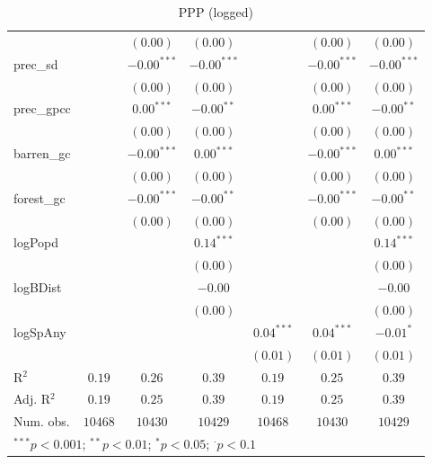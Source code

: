 \begin{sidewaystable}
\begin{center}
{\begin{tabular}{l c c c c c c}
                &               & $(0.00)$      & $(0.00)$      &               & $(0.00)$      & $(0.00)$      \\
prec\_sd        &               & $-0.00^{***}$ & $-0.00^{***}$ &               & $-0.00^{***}$ & $-0.00^{***}$ \\
                &               & $(0.00)$      & $(0.00)$      &               & $(0.00)$      & $(0.00)$      \\
prec\_gpcc      &               & $0.00^{***}$  & $-0.00^{**}$  &               & $0.00^{***}$  & $-0.00^{**}$  \\
                &               & $(0.00)$      & $(0.00)$      &               & $(0.00)$      & $(0.00)$      \\
barren\_gc      &               & $-0.00^{***}$ & $0.00^{***}$  &               & $-0.00^{***}$ & $0.00^{***}$  \\
                &               & $(0.00)$      & $(0.00)$      &               & $(0.00)$      & $(0.00)$      \\
forest\_gc      &               & $-0.00^{***}$ & $-0.00^{**}$  &               & $-0.00^{***}$ & $-0.00^{**}$  \\
                &               & $(0.00)$      & $(0.00)$      &               & $(0.00)$      & $(0.00)$      \\
logPopd         &               &               & $0.14^{***}$  &               &               & $0.14^{***}$  \\
                &               &               & $(0.00)$      &               &               & $(0.00)$      \\
logBDist        &               &               & $-0.00$       &               &               & $-0.00$       \\
                &               &               & $(0.00)$      &               &               & $(0.00)$      \\
logSpAny        &               &               &               & $0.04^{***}$  & $0.04^{***}$  & $-0.01^{*}$   \\
                &               &               &               & $(0.01)$      & $(0.01)$      & $(0.01)$      \\
\hline
R$^2$           & $0.19$        & $0.26$        & $0.39$        & $0.19$        & $0.25$        & $0.39$        \\
Adj. R$^2$      & $0.19$        & $0.25$        & $0.39$        & $0.19$        & $0.25$        & $0.39$        \\
Num. obs.       & $10468$       & $10430$       & $10429$       & $10468$       & $10430$       & $10429$       \\
\hline
\multicolumn{7}{l}{\scriptsize{$^{***}p<0.001$; $^{**}p<0.01$; $^{*}p<0.05$; $^{\cdot}p<0.1$}}
\end{tabular}
}
\caption{PPP
	      (logged)}
\label{logPpp}
\end{center}
\end{sidewaystable}

